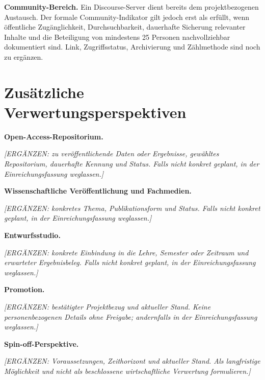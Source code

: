 \documentclass[type=zwischenbericht]{zukunftbau}
\begin{document}
\textbf{Community-Bereich.} Ein Discourse-Server dient bereits dem projektbezogenen Austausch. Der formale Community-Indikator gilt jedoch erst als erfüllt, wenn öffentliche Zugänglichkeit, Durchsuchbarkeit, dauerhafte Sicherung relevanter Inhalte und die Beteiligung von mindestens 25 Personen nachvollziehbar dokumentiert sind. Link, Zugriffsstatus, Archivierung und Zählmethode sind noch zu ergänzen.

\section{Zusätzliche Verwertungsperspektiven}

\textbf{Open-Access-Repositorium.}
\begin{Blockquote}
\textit{[ERGÄNZEN: zu veröffentlichende Daten oder Ergebnisse, gewähltes Repositorium, dauerhafte Kennung und Status. Falls nicht konkret geplant, in der Einreichungsfassung weglassen.]}
\end{Blockquote}

\textbf{Wissenschaftliche Veröffentlichung und Fachmedien.}
\begin{Blockquote}
\textit{[ERGÄNZEN: konkretes Thema, Publikationsform und Status. Falls nicht konkret geplant, in der Einreichungsfassung weglassen.]}
\end{Blockquote}

\textbf{Entwurfsstudio.}
\begin{Blockquote}
\textit{[ERGÄNZEN: konkrete Einbindung in die Lehre, Semester oder Zeitraum und erwarteter Ergebnisbeleg. Falls nicht konkret geplant, in der Einreichungsfassung weglassen.]}
\end{Blockquote}

\textbf{Promotion.}
\begin{Blockquote}
\textit{[ERGÄNZEN: bestätigter Projektbezug und aktueller Stand. Keine personenbezogenen Details ohne Freigabe; andernfalls in der Einreichungsfassung weglassen.]}
\end{Blockquote}

\textbf{Spin-off-Perspektive.}
\begin{Blockquote}
\textit{[ERGÄNZEN: Voraussetzungen, Zeithorizont und aktueller Stand. Als langfristige Möglichkeit und nicht als beschlossene wirtschaftliche Verwertung formulieren.]}
\end{Blockquote}

\makeappendices
{}




\listofappendices
\listofglossaries
\listofabbreviations
\SemioReferences
\end{document}
